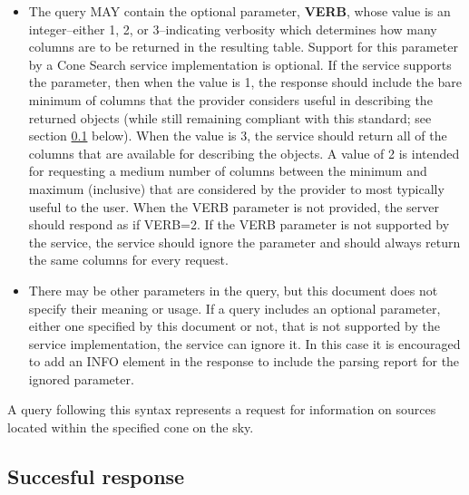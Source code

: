 \documentclass[11pt,a4paper]{ivoa}
\begin{document}
\begin{itemize}
		\item The query MAY contain the optional parameter,
			\textbf{VERB}, whose value is an integer--either 1, 2, or 3--indicating
			verbosity which determines how many columns are to be returned in the
			resulting table. Support for this parameter by a Cone Search service
			implementation is optional. If the service supports the parameter, then
			when the value is 1, the response should include the bare minimum of
			columns that the provider considers useful in describing the returned
			objects (while still remaining compliant with this standard; see section
			\ref{subsec:response} below). When the value is 3, the service should return all of the
			columns that are available for describing the objects. A value of 2 is
			intended for requesting a medium number of columns between the minimum
			and maximum (inclusive) that are considered by the provider to most
			typically useful to the user. When the VERB parameter is not provided,
			the server should respond as if VERB=2. If the VERB parameter is not
			supported by the service, the service should ignore the parameter and
			should always return the same columns for every request.
		\item There may be other parameters in the query, but this document does not
			specify their meaning or usage. If a query includes an optional parameter,
			either one specified by this document or not, that is not supported by
			the service implementation, the service can ignore it. In this
			case it is encouraged to add an INFO element in the response to 
			include the parsing report for the ignored parameter. 
	\end{itemize}
	
	A query following this syntax represents a request for
	information on sources located within the specified cone on the sky.

\subsection{Succesful response}
\label{subsec:response}
\end{document}
